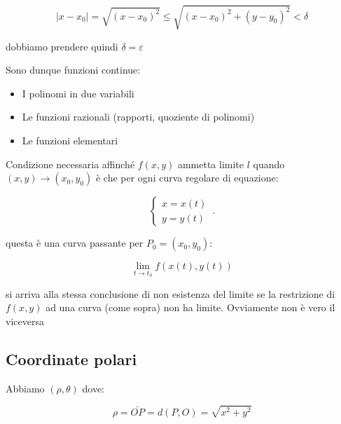 \documentclass[11pt]{article}
\begin{document}
\[
|x-x_0| = \sqrt{(x-x_0)^{2}}\le \sqrt{(x - x_0) ^{2} + (y- y_0) ^{2}} < \delta
\]

dobbiamo prendere quindi $ \delta =\varepsilon$



Sono dunque funzioni continue:

\begin{itemize}
    \item I polinomi in due variabili 
    \item Le funzioni razionali (rapporti, quoziente di polinomi)
    \item Le funzioni elementari 
\end{itemize}


Condizione necessaria affinché $f(x,y)$ ammetta limite $l$ quando $(x,y) \rightarrow  (x_0,y_0)$ è che per ogni curva regolare di equazione:

\begin{equation}
    \begin{cases}
           x=x(t)\\
           y=y(t)
    \end{cases}\,.
\end{equation}

questa è una curva  passante per $P_0= (x_0,y_0)$:

\[
    \lim_{ t \to t_0 } f(x(t), y(t)) 
\]

si arriva alla stessa conclusione di non esistenza del limite se la restrizione di $f(x,y)$ ad una curva (come sopra) non ha limite. Ovviamente non è vero il viceversa

\subsection{Coordinate polari}

Abbiamo $(\rho,\theta)$ dove:

\[
    \rho = \bar{ OP} = d(P,O) = \sqrt{x^{2}+y^{2}}
\]
\end{document}
